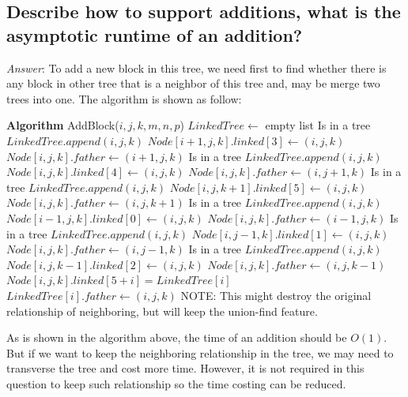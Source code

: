 \documentclass[11pt]{article}
\begin{document}
\subsection{Describe how to support additions, what is the asymptotic runtime of an addition?}
\noindent \emph{Answer}: To add a new block in this tree, we need first to find whether there is any block in other tree that is a neighbor of this tree and, may be merge two trees into one. The algorithm is shown as follow:
\begin{algorithmic}
	\State \textbf{Algorithm} AddBlock($i,j,k,m,n,p$)
	\State $LinkedTree\gets$ empty list
		 \Comment Is in a tree
			\State $LinkedTree.append(i,j,k)$
			\State $Node[i+1,j,k].linked[3] \gets (i,j,k)$
			\State $Node[i,j,k].father \gets (i+1,j,k)$
		\EndIf
	\EndIf
		 \Comment Is in a tree
			\State $LinkedTree.append(i,j,k)$
			\State $Node[i,j,k].linked[4] \gets (i,j,k)$
			\State $Node[i,j,k].father \gets (i,j+1,k)$
		\EndIf
	\EndIf
		 \Comment Is in a tree
			\State $LinkedTree.append(i,j,k)$
			\State $Node[i,j,k+1].linked[5] \gets (i,j,k)$
			\State $Node[i,j,k].father \gets (i,j,k+1)$
		\EndIf
	\EndIf
		 \Comment Is in a tree
			\State $LinkedTree.append(i,j,k)$
			\State $Node[i-1,j,k].linked[0] \gets (i,j,k)$
			\State $Node[i,j,k].father \gets (i-1,j,k)$
		\EndIf
	\EndIf
		 \Comment Is in a tree
			\State $LinkedTree.append(i,j,k)$
			\State $Node[i,j-1,k].linked[1] \gets (i,j,k)$
			\State $Node[i,j,k].father \gets (i,j-1,k)$
		\EndIf
	\EndIf
		 \Comment Is in a tree
			\State $LinkedTree.append(i,j,k)$
			\State $Node[i,j,k-1].linked[2] \gets (i,j,k)$
			\State $Node[i,j,k].father \gets (i,j,k-1)$
		\EndIf
	\EndIf
			\State $Node[i,j,k].linked[5+i] = LinkedTree[i]$
			\State $LinkedTree[i].father \gets (i,j,k)$ \Comment NOTE: This might destroy the original relationship of neighboring, but will keep the union-find feature.
		\EndFor
	\EndIf
\end{algorithmic}

As is shown in the algorithm above, the time of an addition should be $O(1)$. But if we want to keep the neighboring relationship in the tree, we may need to transverse the tree and cost more time. However, it is not required in this question to keep such relationship so the time costing can be reduced.
\end{document}
